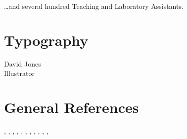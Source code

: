 \dots and several hundred Teaching and Laboratory Assistants.

\section*{Typography}

David Jones\\
Illustrator

\section{General References}

 \cite{Bender2005},
 \cite{Biggs2002},
 \cite{CormenLRS2009},   %
 \cite{Gersting2003},
 \cite{GoodaireP2001},
 \cite{HaggardSW2005},
 \cite{MR1952453},      %
 \cite{MichaelsR1991},
 \cite{Polya1957},
 \cite{Rosen2002},
 \cite{Schneierman2012},
 \cite{Strang1986}

\endinput

